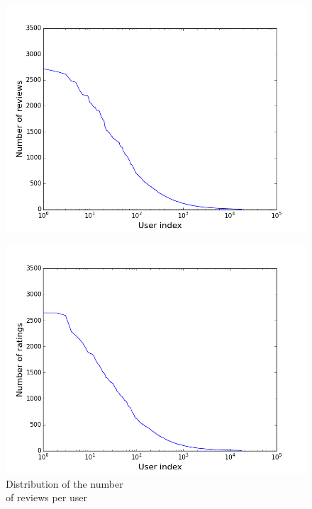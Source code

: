 \documentclass{article}
\begin{document}
\begin{figure}
\centering
\begin{minipage}{.6\textwidth}
  
  \includegraphics[width=\linewidth]{NbRatingsPerUser.png}
  
	 \label{NbRatingsPerUser}
\end{minipage}%
\centering
\begin{minipage}{.6\textwidth}
  
  \includegraphics[width=\linewidth]{NbReviewsPerUser.png}
  \caption{Distribution of the number\\ of reviews per user} 
  \label{NbReviewsPerUser}
\end{minipage}
\end{figure}
\end{document}

